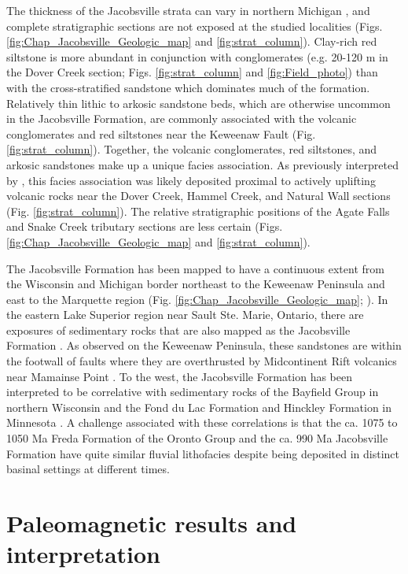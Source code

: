 The thickness of the Jacobsville strata can vary in northern Michigan \citep{Hamblin1958a, Kalliokoski1982a}, and complete stratigraphic sections are not exposed at the studied localities (Figs. \ref{fig:Chap_Jacobsville_Geologic_map} and \ref{fig:strat_column}). Clay-rich red siltstone is more abundant in conjunction with conglomerates (e.g. 20-120 m in the Dover Creek section; Figs. \ref{fig:strat_column} and \ref{fig:Field_photo}) than with the cross-stratified sandstone which dominates much of the formation. Relatively thin lithic to arkosic sandstone beds, which are otherwise uncommon in the Jacobsville Formation, are commonly associated with the volcanic conglomerates and red siltstones near the Keweenaw Fault (Fig. \ref{fig:strat_column}). Together, the volcanic conglomerates, red siltstones, and arkosic sandstones make up a unique facies association. As previously interpreted by \cite{Brojanigo1984a}, this facies association was likely deposited proximal to actively uplifting volcanic rocks near the Dover Creek, Hammel Creek, and Natural Wall sections (Fig. \ref{fig:strat_column}). The relative stratigraphic positions of the Agate Falls and Snake Creek tributary sections are less certain (Figs. \ref{fig:Chap_Jacobsville_Geologic_map} and \ref{fig:strat_column}).

The Jacobsville Formation has been mapped to have a continuous extent from the Wisconsin and Michigan border northeast to the Keweenaw Peninsula and east to the Marquette region (Fig. \ref{fig:Chap_Jacobsville_Geologic_map}; \citealp{Hamblin1958a, Cannon1995a, Cannon1996a, Cannon2001a}). In the eastern Lake Superior region near Sault Ste. Marie, Ontario, there are exposures of sedimentary rocks that are also mapped as the Jacobsville Formation \citep{Hamblin1958a}. As observed on the Keweenaw Peninsula, these sandstones are within the footwall of faults where they are overthrusted by Midcontinent Rift volcanics near Mamainse Point \citep{Manson1994a}. To the west, the Jacobsville Formation has been interpreted to be correlative with sedimentary rocks of the Bayfield Group in northern Wisconsin and the Fond du Lac Formation and Hinckley Formation in Minnesota \citep{Thwaites1912a, Hamblin1958a, Wallace1971a, Kalliokoski1982a, Ojakangas2001b}. A challenge associated with these correlations is that the ca. 1075 to 1050 Ma Freda Formation of the Oronto Group and the ca. 990 Ma Jacobsville Formation have quite similar fluvial lithofacies despite being deposited in distinct basinal settings at different times.

\section*{Paleomagnetic results and interpretation}

